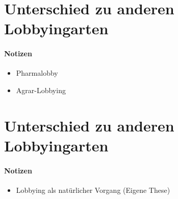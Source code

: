 \section{Unterschied zu anderen Lobbyingarten}

\paragraph{Notizen}
\begin{itemize}
\item Pharmalobby
\item Agrar-Lobbying
\end{itemize}

\section{Unterschied zu anderen Lobbyingarten}

\paragraph{Notizen}
\begin{itemize}
\item Lobbying als natürlicher Vorgang (Eigene These)
\end{itemize}

\cite{LeifSpeth200312}


\newpage




